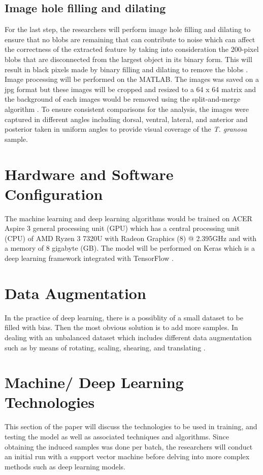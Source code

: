 \subsection{Image hole filling and dilating}
For the last step, the researchers will perform image hole filling and dilating to ensure that no blobs are remaining that can contribute to noise which can affect the correctness of the extracted feature by taking into consideration the 200-pixel blobs that are disconnected from the largest object in its binary form. This will result in black pixels made by binary filling and dilating to remove the blobs \cite{concepcion2023}.
Image processing will be performed on the MATLAB. The images was saved on a jpg format but these images will be cropped and resized to a 64 x 64 matrix and the background of each images would be removed using the split-and-merge algorithm \cite{cui2020}. 
To ensure consistent comparisons for the analysis, the images were captured in different angles including dorsal, ventral, lateral, and anterior and posterior taken in uniform angles to provide visual coverage of the \textit{T. granosa} sample. 

\section{Hardware and Software Configuration}
The machine learning and deep learning algorithms would be trained on ACER Aspire 3 general processing unit (GPU) which has a central processing unit (CPU) of  AMD Ryzen 3 7320U with Radeon Graphics (8) @ 2.395GHz and with a memory of 8 gigabyte (GB). The model will be performed on Keras which is a deep learning framework integrated with TensorFlow \cite{cui2020}.

\section{Data Augmentation}
In the practice of deep learning, there is a possiblity of a small dataset to be filled with bias. Then the most obvious solution is to add more samples. In dealing with an unbalanced dataset which includes different data augmentation such as by means of rotating, scaling, shearing, and translating \cite{cui2020}.

\section{Machine/ Deep Learning Technologies}
This section of the paper will discuss the technologies to be used in training, and testing the model as well as associated techniques and algorithms.  Since obtaining the induced samples was done per batch, the researchers will conduct an initial run with a support vector machine before delving into more complex methods such as deep learning models. 

